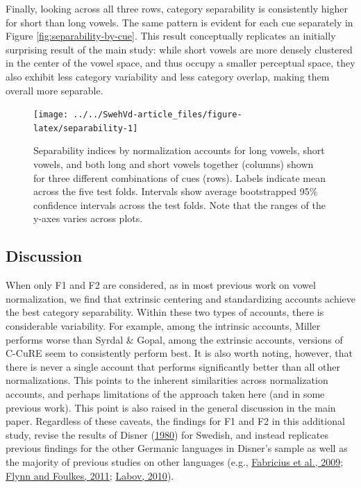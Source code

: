 \documentclass[utf8]{frontiers_suppmat} %
\begin{document}
Finally, looking across all three rows, category separability is consistently higher for short than long vowels. The same pattern is evident for each cue separately in Figure \ref{fig:separability-by-cue}. This result conceptually replicates an initially surprising result of the main study: while short vowels are more densely clustered in the center of the vowel space, and thus occupy a smaller perceptual space, they also exhibit less category variability and less category overlap, making them overall more separable.



\begin{figure}

{\centering \texttt{[image: ../../SwehVd-article\_files/figure-latex/separability-1]} 

}

\caption{Separability indices by normalization accounts for long vowels, short vowels, and both long and short vowels together (columns) shown for three different combinations of cues (rows). Labels indicate mean across the five test folds. Intervals show average bootstrapped 95\% confidence intervals across the test folds. Note that the ranges of the y-axes varies across plots.}\label{fig:separability}
\end{figure}

\hypertarget{sec:studyI-discussion}{%
\subsection{Discussion}\label{sec:studyI-discussion}}

When only F1 and F2 are considered, as in most previous work on vowel normalization, we find that extrinsic centering and standardizing accounts achieve the best category separability. Within these two types of accounts, there is considerable variability. For example, among the intrinsic accounts, Miller performs worse than Syrdal \& Gopal, among the extrinsic accounts, versions of C-CuRE seem to consistently perform best. It is also worth noting, however, that there is never a single account that performs significantly better than all other normalizations. This points to the inherent similarities across normalization accounts, and perhaps limitations of the approach taken here (and in some previous work). This point is also raised in the general discussion in the main paper. Regardless of these caveats, the findings for F1 and F2 in this additional study, revise the results of Disner (\protect\hyperlink{ref-disner1980}{1980}) for Swedish, and instead replicates previous findings for the other Germanic languages in Disner's sample as well as the majority of previous studies on other languages (e.g., \protect\hyperlink{ref-fabricius2009}{Fabricius et al., 2009}; \protect\hyperlink{ref-Flynn2011}{Flynn and Foulkes, 2011}; \protect\hyperlink{ref-labov2010}{Labov, 2010}).
\end{document}
